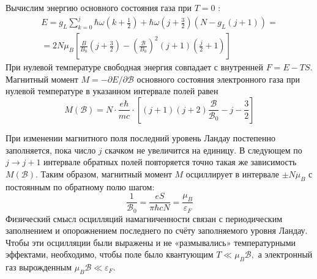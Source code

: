 \documentclass[a4paper,12pt]{article} %
\begin{document}
\begin{ttask}
Вычислим энергию основного состояния газа при $T=0$ :
$$
\begin{array}{l}
	E=g_{L} \sum_{k=0}^{j} 
	\hbar \omega
	\left(k+\frac{1}{2}\right)
	+
	\hbar \omega
	\left(j+\frac{3}{2}\right)
	\left(N-g_{L}(j+1)\right)
	= \\
	=
	2 N \mu_{B}
	\left[
	\frac{B}{B_{0}}\left(j+\frac{3}{2}\right)
	-
	\left(\frac{\mathcal{B}}{B_{0}}\right)^{2}(j+1)\left(\frac{j}{2}+1\right)
	\right]
\end{array}
$$
При нулевой температуре свободная энергия совпадает с внутренней $F=E-T S$. 
Магнитный момент $M=-\partial E / \partial \mathcal{B}$ основного состояния 
электронного газа при нулевой температуре в указанном интервале полей равен
$$
M(\mathcal{B})
=
N \cdot \frac{e \hbar}{m c} \cdot
\left[
(j+1)(j+2) \frac{\mathcal{B}}{\mathcal{B}_{0}}
-
j-\frac{3}{2}
\right]
$$



При изменении магнитного поля последний уровень Ландау постепенно заполняется, пока число $j$ скачком не увеличится на единицу. В следующем
по $j \rightarrow j+1$ интервале обратных полей повторяется точно такая же зависимость $M(\mathcal{B})$. 
Таким образом, магнитный момент $M$ осциллирует в интервале $\pm N \mu_{B}$ с постоянным по обратному полю шагом:
$$
\frac{1}{\mathcal{B}_{0}}=\frac{e S}{\pi \hbar c N}=\frac{\mu_{B}}{\varepsilon_{F}}
$$
Физический смысл осцилляций намагниченности связан с периодическим заполнением и 
опорожнением последнего по счёту заполняемого уровня Ландау. 
Чтобы эти осцилляции были выражены и не «размывались» температурными эффектами, необходимо, 
чтобы поле было квантующим $T \ll \mu_{B} \mathcal{B},$ а 
электронный газ вырожденным $\mu_{B} \mathcal{B} \ll \varepsilon_{F} .$ 






























\end{ttask}
\end{document}
